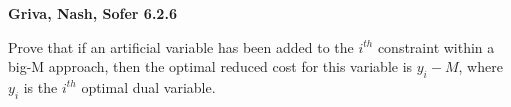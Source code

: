 \textbf{Griva, Nash, Sofer 6.2.6}

Prove that if an artificial variable has been added to the $i^{th}$ constraint within a big-M approach, then the optimal 
reduced cost for this variable is $y_i - M$, where $y_i$ is the $i^{th}$ optimal dual variable.

\begin{solution}
  \ \\
  \vfill
\end{solution}
